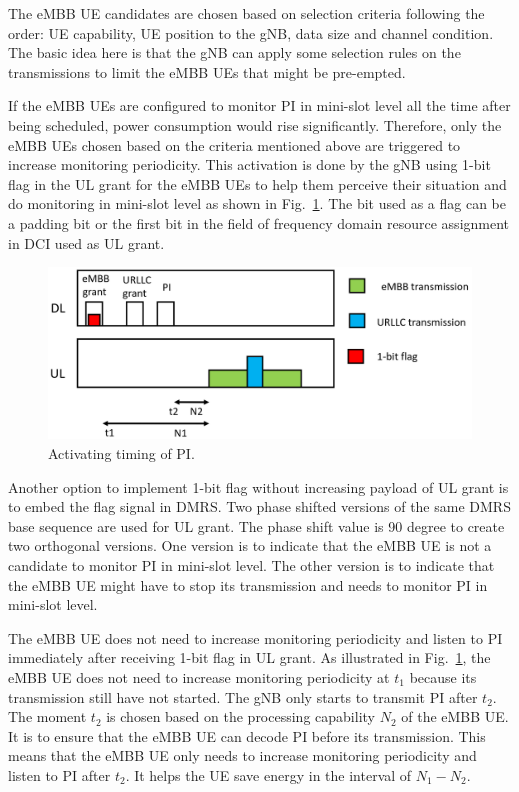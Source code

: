 \documentclass{ieeeaccess}
\begin{document}
The eMBB UE candidates are chosen based on selection criteria following the order: UE capability, UE position to the gNB, data size and channel condition. The basic idea here is that the gNB can apply some selection rules on the transmissions to limit the eMBB UEs that might be pre-empted.

If the eMBB UEs are configured to monitor PI in mini-slot level all the time after being scheduled, power consumption would rise significantly. Therefore, only the eMBB UEs chosen based on the criteria mentioned above are triggered to increase monitoring periodicity. This activation is done by the gNB using 1-bit flag in the UL grant for the eMBB UEs to help them perceive their situation and do monitoring in mini-slot level as shown in Fig.~\ref{fig17}. The bit used as a flag can be a padding bit or the first bit in the field of frequency domain resource assignment in DCI used as UL grant.

\begin{figure}[htbp]
\centerline{\includegraphics[scale=0.17]{fig17.png}}
\caption{Activating timing of PI.}
\label{fig17}
\vspace{-2mm}
\end{figure}

Another option to implement 1-bit flag without increasing payload of UL grant is to embed the flag signal in DMRS. Two phase shifted versions of the same DMRS base sequence are used for UL grant. The phase shift value is 90 degree to create two orthogonal versions. One version is to indicate that the eMBB UE is not a candidate to monitor PI in mini-slot level. The other version is to indicate that the eMBB UE might have to stop its transmission and needs to monitor PI in mini-slot level. 

The eMBB UE does not need to increase monitoring periodicity and listen to PI immediately after receiving 1-bit flag in UL grant. As illustrated in Fig.~\ref{fig17}, the eMBB UE does not need to increase monitoring periodicity at $t_1$ because its transmission still have not started. The gNB only starts to transmit PI after $t_2$. The moment $t_2$ is chosen based on the processing capability $N_2$ of the eMBB UE. It is to ensure that the eMBB UE can decode PI before its transmission. This means that the eMBB UE only needs to increase monitoring periodicity and listen to PI after $t_2$. It helps the UE save energy in the interval of $N_1-N_2$.
\end{document}
